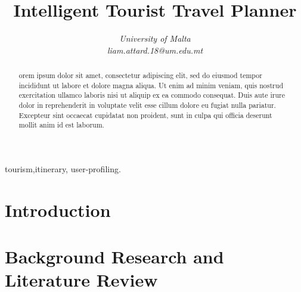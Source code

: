 \documentclass[conference]{IEEEtran}
\title{Intelligent Tourist Travel Planner}
\author{\IEEEauthorblockN{Liam Attard [0299300L] }
\IEEEauthorblockA{Department of Artificial Intelligence}
\textit{University of Malta}\\
\textit{liam.attard.18@um.edu.mt}}
\begin{document}
  \maketitle

  \begin{abstract}
    orem ipsum dolor sit amet, consectetur adipiscing elit, sed do
    eiusmod tempor incididunt ut labore et dolore magna aliqua. Ut
    enim ad minim veniam, quis nostrud exercitation ullamco laboris
    nisi ut aliquip ex ea commodo consequat. Duis aute irure dolor in
    reprehenderit in voluptate velit esse cillum dolore eu fugiat
    nulla pariatur. Excepteur sint occaecat cupidatat non proident,
    sunt in culpa qui officia deserunt mollit anim id est laborum.
  \end{abstract}

  \begin{IEEEkeywords}
  tourism,itinerary, user-profiling.
  \end{IEEEkeywords}

  \section{Introduction}
    

  \section{Background Research and Literature Review}
    

  
  
\end{document}
